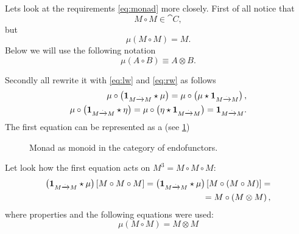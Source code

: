 Lets look at the requirements \eqref{eq:monad} more closely. 
First of all notice that 
\[
M \circ M \in \cat{C},
\]
but
\[
\mu(M \circ M) = M.
\]
Below we will use the following notation
\[
\mu(A \circ B) \equiv A \otimes B.
\]


Secondly 
all rewrite it with \eqref{eq:lw} and \eqref{eq:rw} as follows
\begin{eqnarray}
  \mu \circ \left( \mathbf{1}_{ M \xrightarrow{.} M } \star \mu \right) = 
  \mu \circ \left( \mu \star \mathbf{1}_{ M \xrightarrow{.} M } \right), 
  \nonumber \\
  \mu \circ \left( \mathbf{1}_{ M \xrightarrow{.} M } \star \eta \right) = 
  \mu \circ \left( \eta \star \mathbf{1}_{ M \xrightarrow{.} M } \right) = \mathbf{1}_{ M \xrightarrow{.} M }.
  \label{eq:monad_p1}
\end{eqnarray}
The first equation can be represented as a
 (see \cref{fig:monad_monoid1})
\begin{figure}
  \centering
  \caption{Monad as monoid in the category of endofunctors.}
  \label{fig:monad_monoid1}
\end{figure}
Let look how the first equation acts on $M^3 = M \circ M \circ M$:
\begin{eqnarray}
\left( \mathbf{1}_{ M \xrightarrow{.} M } \star \mu \right) \left[ M \circ M \circ M
\right] = 
\left( \mathbf{1}_{ M \xrightarrow{.} M } \star \mu \right) \left[ M \circ \left( M \circ M \right)
\right] = 
\nonumber \\
= M \circ \left(M \otimes M\right), 
\nonumber
\end{eqnarray}
where properties  and the
following equations were used:
\[
\mu \left(M \circ M\right) = M \otimes M
\]
